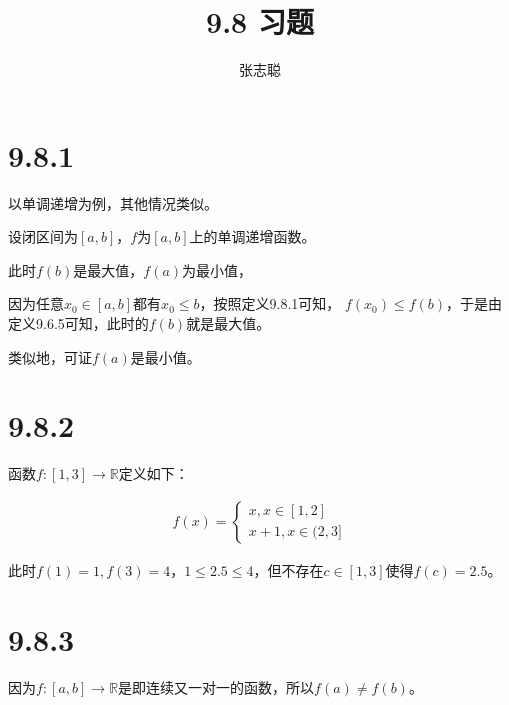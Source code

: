 \documentclass{article}
\begin{document}
\title{9.8 习题}
\author{张志聪}
\maketitle

\section*{9.8.1}

以单调递增为例，其他情况类似。

设闭区间为$[a, b]$，$f$为$[a, b]$上的单调递增函数。

此时$f(b)$是最大值，$f(a)$为最小值，

因为任意$x_0 \in [a, b]$都有$x_0 \leq b$，按照定义9.8.1可知，
$f(x_0) \leq f(b)$，于是由定义9.6.5可知，此时的$f(b)$就是最大值。

类似地，可证$f(a)$是最小值。

\section*{9.8.2}

函数$f: [1, 3] \to \mathbb{R}$定义如下：

\begin{eqnarray*}
  f(x) =
  \begin{cases*}
    x, x \in [1, 2] \\
    x+1, x \in (2,3]
  \end{cases*}
\end{eqnarray*}

此时$f(1) = 1, f(3) = 4$，$1 \leq 2.5 \leq 4$，但不存在$c \in [1, 3]$使得$f(c) = 2.5$。

\section*{9.8.3}

因为$f: [a, b] \to \mathbb{R}$是即连续又一对一的函数，所以$f(a) \neq f(b)$。
\end{document}
